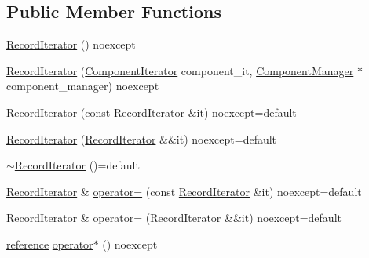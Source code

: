 \subsection*{Public Member Functions}
\begin{DoxyCompactItemize}
\item 
\mbox{\hyperlink{classmage_1_1_component_manager_1_1_record_iterator_ab326025df2a32173b4a20ba612df9852}{Record\+Iterator}} () noexcept
\item 
\mbox{\hyperlink{classmage_1_1_component_manager_1_1_record_iterator_a6bca19873a9dc36354b9740ba114dabe}{Record\+Iterator}} (\mbox{\hyperlink{classmage_1_1_component_manager_1_1_record_iterator_aa9973dbab16d4cf276118634b8b43ece}{Component\+Iterator}} component\+\_\+it, \mbox{\hyperlink{classmage_1_1_component_manager}{Component\+Manager}} $\ast$component\+\_\+manager) noexcept
\item 
\mbox{\hyperlink{classmage_1_1_component_manager_1_1_record_iterator_a025fda1a43ce729ed0c72fe51f0dc81c}{Record\+Iterator}} (const \mbox{\hyperlink{classmage_1_1_component_manager_1_1_record_iterator}{Record\+Iterator}} \&it) noexcept=default
\item 
\mbox{\hyperlink{classmage_1_1_component_manager_1_1_record_iterator_a7068cbff79d93845c1178d14f16afbc5}{Record\+Iterator}} (\mbox{\hyperlink{classmage_1_1_component_manager_1_1_record_iterator}{Record\+Iterator}} \&\&it) noexcept=default
\item 
\mbox{\hyperlink{classmage_1_1_component_manager_1_1_record_iterator_a103579e12968d6fc542d7c0a73d7187b}{$\sim$\+Record\+Iterator}} ()=default
\item 
\mbox{\hyperlink{classmage_1_1_component_manager_1_1_record_iterator}{Record\+Iterator}} \& \mbox{\hyperlink{classmage_1_1_component_manager_1_1_record_iterator_a26b56736e83ee4a5896d6e3ec74a448c}{operator=}} (const \mbox{\hyperlink{classmage_1_1_component_manager_1_1_record_iterator}{Record\+Iterator}} \&it) noexcept=default
\item 
\mbox{\hyperlink{classmage_1_1_component_manager_1_1_record_iterator}{Record\+Iterator}} \& \mbox{\hyperlink{classmage_1_1_component_manager_1_1_record_iterator_ad09f417372c83ed5bac7212f670439fd}{operator=}} (\mbox{\hyperlink{classmage_1_1_component_manager_1_1_record_iterator}{Record\+Iterator}} \&\&it) noexcept=default
\item 
\mbox{\hyperlink{classmage_1_1_component_manager_1_1_record_iterator_a79a091c8d61811bc67982e19500ab6eb}{reference}} \mbox{\hyperlink{classmage_1_1_component_manager_1_1_record_iterator_ac27d0c445133d343929925dc0005dc97}{operator$\ast$}} () noexcept

\end{DoxyCompactItemize}
